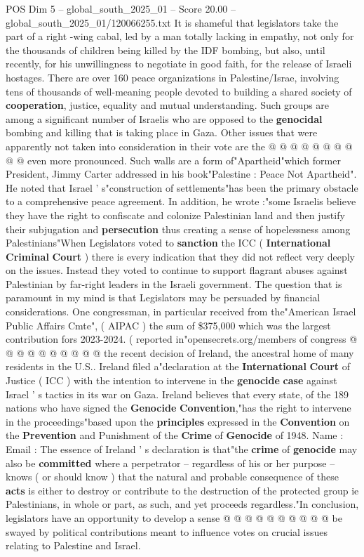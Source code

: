 \begin{textsample}{POS Dim 5 – global\_south\_2025\_01 – Score 20.00 – global\_south\_2025\_01/120066255.txt}
It is shameful that legislators take the part of a right -wing cabal, led by a man totally lacking in empathy, not only for the thousands of children being killed by the IDF bombing, but also, until recently, for his unwillingness to negotiate in good faith, for the release of Israeli hostages.
There are over 160 peace organizations in Palestine/Israe, involving tens of thousands of well-meaning people devoted to building a shared society of \textbf{cooperation}, justice, equality and mutual understanding.
Such groups are among a significant number of Israelis who are opposed to the \textbf{genocidal} bombing and killing that is taking place in Gaza.
Other issues that were apparently not taken into consideration in their vote are the @ @ @ @ @ @ @ @ @ @ even more pronounced.
Such walls are a form of"Apartheid"which former President, Jimmy Carter addressed in his book"Palestine : Peace Not Apartheid".
He noted that Israel ' s"construction of settlements"has been the primary obstacle to a comprehensive peace agreement.
In addition, he wrote :"some Israelis believe they have the right to confiscate and colonize Palestinian land and then justify their subjugation and \textbf{persecution} thus creating a sense of hopelessness among Palestinians"When Legislators voted to \textbf{sanction} the ICC ( \textbf{International} \textbf{Criminal} \textbf{Court} ) there is every indication that they did not reflect very deeply on the issues.
Instead they voted to continue to support flagrant abuses against Palestinian by far-right leaders in the Israeli government.
The question that is paramount in my mind is that Legislators may be persuaded by financial considerations.
One congressman, in particular received from the"American Israel Public Affairs Cmte", ( AIPAC ) the sum of \$375,000 which was the largest contribution fors 2023-2024. ( reported in"opensecrets.org/members of congress @ @ @ @ @ @ @ @ @ @ the recent decision of Ireland, the ancestral home of many residents in the U.S..
Ireland filed a"declaration at the \textbf{International} \textbf{Court} of Justice ( ICC ) with the intention to intervene in the \textbf{genocide} \textbf{case} against Israel ' s tactics in its war on Gaza.
Ireland believes that every state, of the 189 nations who have signed the \textbf{Genocide} \textbf{Convention},"has the right to intervene in the proceedings"based upon the \textbf{principles} expressed in the \textbf{Convention} on the \textbf{Prevention} and Punishment of the \textbf{Crime} of \textbf{Genocide} of 1948.
Name : Email : The essence of Ireland ' s declaration is that"the \textbf{crime} of \textbf{genocide} may also be \textbf{committed} where a perpetrator -- regardless of his or her purpose -- knows ( or should know ) that the natural and probable consequence of these \textbf{acts} is either to destroy or contribute to the destruction of the protected group ie Palestinians, in whole or part, as such, and yet proceeds regardless."In conclusion, legislators have an opportunity to develop a sense @ @ @ @ @ @ @ @ @ @ be swayed by political contributions meant to influence votes on crucial issues relating to Palestine and Israel.

\end{textsample}

